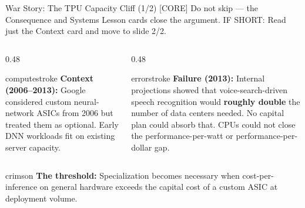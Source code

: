 \documentclass[aspectratio=169, 12pt]{beamer}
\begin{document}
\begin{frame}{War Story: The TPU Capacity Cliff (1/2)}
{%
[CORE] Do not skip --- the Consequence and Systems Lesson cards close the argument.
IF SHORT: Read just the Context card and move to slide 2/2.
}

\small
\begin{columns}[T]
  \begin{column}{0.48\textwidth}
    \begin{mlsyscard}{computestroke}
    {\footnotesize \textbf{Context (2006--2013):} Google considered custom neural-network ASICs from 2006 but treated them as optional. Early DNN workloads fit on existing server capacity.}
    \end{mlsyscard}
  \end{column}
  \begin{column}{0.48\textwidth}
    \begin{mlsyscard}{errorstroke}
    {\footnotesize \textbf{Failure (2013):} Internal projections showed that voice-search-driven speech recognition would \textbf{roughly double} the number of data centers needed. No capital plan could absorb that. CPUs could not close the performance-per-watt or performance-per-dollar gap.}
    \end{mlsyscard}
  \end{column}
\end{columns}

\vspace{0.1cm}
\begin{mlsyscard}{crimson}
{\scriptsize \textbf{The threshold:} Specialization becomes necessary when cost-per-inference on general hardware exceeds the capital cost of a custom ASIC at deployment volume.}
\end{mlsyscard}

\end{frame}
\end{document}
